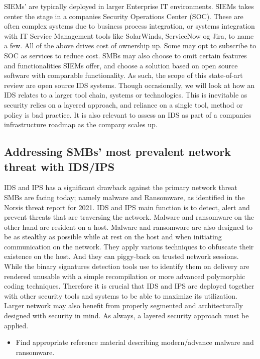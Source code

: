 SIEMs' are typically deployed in larger Enterprise IT environments. SIEMs takes center the stage in a companies Security Operations Center (SOC). These are often complex systems due to business process integration, or systems integration with IT Service Management tools like SolarWinds, ServiceNow og Jira, to name a few. All of the above drives cost of ownership up. Some may opt to subscribe to SOC as services to reduce cost. SMBs may also choose to omit certain features and functionalities SIEMs offer, and choose a solution based on open source software with comparable functionality. As such, the scope of this state-of-art review are open source IDS systems. Though occasionally, we will look at how an IDS relates to a larger tool chain, systems or technologies. This is inevitable as security relies on a layered approach, and reliance on a single tool, method or policy is bad practice. It is also relevant to assess an IDS as part of a companies infrastructure roadmap as the company scales up.

\subsection{Addressing SMBs' most prevalent network threat with IDS/IPS}

IDS and IPS has a significant drawback against the primary network threat SMBs are facing today; namely malware and Ransomware, as identified in the Norsis \cite{Norsis2021} threat report for 2021. IDS and IPS main function is to detect, alert and prevent threats that are traversing the network. Malware and ransomware on the other hand are resident on a host. Malware and ransomware are also designed to be as stealthy as possible while at rest on the host and when initiating communication on the network. They apply various techniques to obfuscate their existence on the host. And they can piggy-back on trusted network sessions. While the binary signatures detection tools use to identify them on delivery are rendered unusable with a simple recompilation or more advanced polymorphic coding techniques. Therefore it is crucial that IDS and IPS are deployed together with other security tools and systems to be able to maximize its utilization. Larger network may also benefit from properly segmented and architecturally designed with security in mind. As always, a layered security approach must be applied.

\begin{followup}[to-do]
    \begin{itemize}
        \item Find appropriate reference material describing modern/advance malware and ransomware.
    \end{itemize}
    
\end{followup}